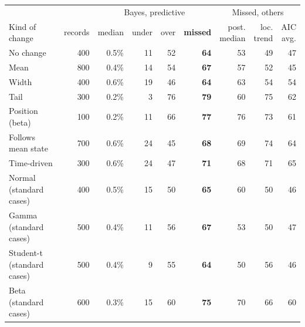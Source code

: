 \begin{tabular}{l r rrr r rrr}
\toprule
 & & \multicolumn{4}{c}{Bayes, predictive} & \multicolumn{3}{c}{Missed, others} \\
\cmidrule(lr){3-6}\cmidrule(lr){7-9}
Kind of change & records & median & under & over & \textbf{missed} & \shortstack{post.\\median} & \shortstack{loc.\\trend} & \shortstack{AIC\\avg.} \\
\midrule
No change & 400 & 0.5\% & 11 & 52 & \textbf{64} & 53 & 49 & 47 \\
Mean & 800 & 0.4\% & 14 & 54 & \textbf{67} & 57 & 52 & 45 \\
Width & 400 & 0.6\% & 19 & 46 & \textbf{64} & 63 & 54 & 54 \\
Tail & 300 & 0.2\% & 3 & 76 & \textbf{79} & 60 & 75 & 62 \\
Position (beta) & 100 & 0.2\% & 11 & 66 & \textbf{77} & 76 & 73 & 61 \\
Follows mean state & 700 & 0.6\% & 24 & 45 & \textbf{68} & 69 & 74 & 64 \\
Time-driven & 300 & 0.6\% & 24 & 47 & \textbf{71} & 68 & 71 & 65 \\
\midrule
Normal (standard cases) & 400 & 0.5\% & 15 & 50 & \textbf{65} & 60 & 50 & 46 \\
Gamma (standard cases) & 500 & 0.4\% & 11 & 56 & \textbf{67} & 53 & 50 & 47 \\
Student-t (standard cases) & 500 & 0.4\% & 9 & 55 & \textbf{64} & 50 & 56 & 46 \\
Beta (standard cases) & 600 & 0.3\% & 15 & 60 & \textbf{75} & 70 & 66 & 60 \\
\bottomrule
\end{tabular}
